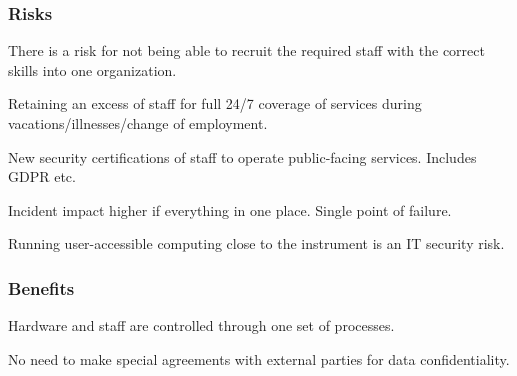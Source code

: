 \documentclass[12pt,a4paper]{article}
\newcommand{\xmark}{\ding{55}}%
\newcommand{\NEG}{{\color{red!75} \xmark}}
\begin{document}
\subsubsection*{Risks}
\bitm
\item {There is a risk for \ESA not being able to recruit the required \einfra staff with the correct skills into one organization.}
\item Retaining an excess of staff for full 24/7 coverage of \ED services during vacations/illnesses/change of employment.
\item New security certifications of staff to operate public-facing services. Includes GDPR etc. 
\item Incident impact higher if everything in one place. Single point of failure. %
\item Running user-accessible computing close to the instrument is an IT security risk.
\eitm

\subsubsection*{Benefits}
\bitm
\item Hardware and staff are controlled through one set of \EC processes.
\item No need to make special agreements with external parties for data confidentiality. %
\eitm
\end{document}
